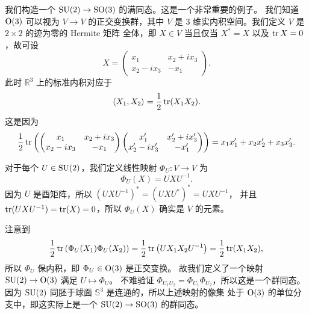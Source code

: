 \begin{example}\label{exa:homo of SU2 and SO3}
  我们构造一个 $\operatorname{SU}(2)\to \operatorname{SO}(3)$ 的满同态。这是一个非常重要的例子。
  我们知道 $\operatorname{O}(3)$ 可以视为 $V\to V$ 的正交变换群，其中 $V$
  是 $3$ 维实内积空间。我们定义 $V$ 是 $2\times 2$ 的迹为零的 Hermite 矩阵
  全体，即 $X\in V$ 当且仅当 $X^*=X$ 以及 $\operatorname{tr} X=0$，故可设
  \begin{equation}\label{eq:expr of X}
    X=\begin{pmatrix}
      x_1 & x_2+ix_3\\
      x_2-ix_3 & -x_1
    \end{pmatrix}.    
  \end{equation}
  此时 $\mathbb{R}^3$ 上的标准内积对应于
  \[
    \langle X_1,X_2\rangle =\frac{1}{2}\operatorname{tr}(X_1X_2).
  \]
  这是因为
  \[
    \frac{1}{2}\operatorname{tr}\left(
      \begin{pmatrix}
        x_1 & x_2+ix_3\\
        x_2-ix_3 & -x_1
      \end{pmatrix}
      \begin{pmatrix}
        x_1' & x_2'+ix_3'\\
        x_2'-ix_3' & -x_1'
      \end{pmatrix}
    \right)=x_1x_1'+x_2x_2'+x_3x_3'.
  \]

  对于每个 $U\in \operatorname{SU}(2)$，我们定义线性映射 $\Phi_U:V\to V$
  为
  \[
      \Phi_U(X)=UXU^{-1}.
  \]
  因为 $U$ 是酉矩阵，所以 $(UXU^{-1})^*=(UXU^*)^*=UXU^{-1}$，
  并且 $\operatorname{tr}(UXU^{-1})=\operatorname{tr}(X)=0$，所以 $\Phi_U(X)$ 确实是 $V$ 的元素。

  注意到
  \[
      \frac{1}{2}\operatorname{tr}\left(
        \Phi_U(X_1)\Phi_U(X_2)
      \right)=\frac{1}{2}\operatorname{tr}\left(UX_1X_2U^{-1}\right)
      =\frac{1}{2}\operatorname{tr}(X_1X_2),
  \]
  所以 $\Phi_U$ 保内积，即 $\Phi_U\in\operatorname{O}(3)$ 是正交变换。
  故我们定义了一个映射 $\operatorname{SU}(2)\to\operatorname{O}(3)$ 满足 $U\mapsto\Phi_U$。
  不难验证 $\Phi_{U_1U_2}=\Phi_{U_1}\Phi_{U_2}$，所以这是一个群同态。
  因为 $\operatorname{SU}(2)$ 同胚于球面 $\mathbb S^3$ 是连通的，所以上述映射的像集
  处于 $\operatorname{O}(3)$ 的单位分支中，即这实际上是一个 $\operatorname{SU}(2)\to\operatorname{SO}(3)$
  的群同态。


\end{example}
